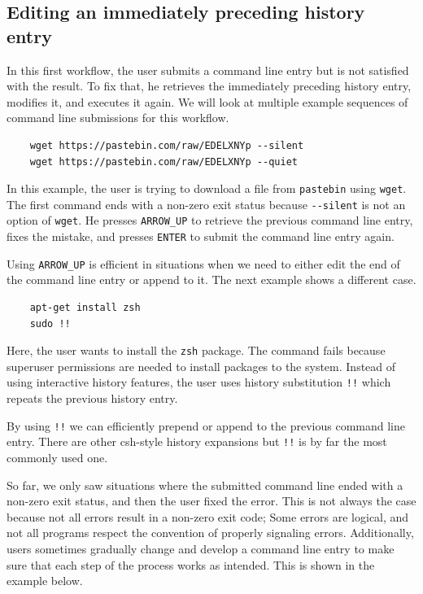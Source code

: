 
\subsection{Editing an immediately preceding history entry}

In this first workflow, the user submits a command line entry but is not satisfied with the result. To fix that, he retrieves the immediately preceding history entry, modifies it, and executes it again. We will look at multiple example sequences of command line submissions for this workflow.

\begin{verbatim}
    wget https://pastebin.com/raw/EDELXNYp --silent
    wget https://pastebin.com/raw/EDELXNYp --quiet
\end{verbatim}
In this example, the user is trying to download a file from \verb|pastebin| using \verb|wget|. The first command ends with a non-zero exit status because \verb|--silent| is not an option of \verb|wget|. He presses \verb|ARROW_UP| to retrieve the previous command line entry, fixes the mistake, and presses \verb|ENTER| to submit the command line entry again. 

Using \verb|ARROW_UP| is efficient in situations when we need to either edit the end of the command line entry or append to it. %
The next example shows a different case.

\begin{verbatim}
    apt-get install zsh
    sudo !!
\end{verbatim}

Here, the user wants to install the \verb|zsh| package. The command fails because superuser permissions are needed to install packages to the system. Instead of using interactive history features, the user uses history substitution \verb|!!| which repeats the previous history entry. 

By using \verb|!!| we can efficiently prepend or append to the previous command line entry. There are other csh-style history expansions but \verb|!!| is by far the most commonly used one. 

So far, we only saw situations where the submitted command line ended with a non-zero exit status, and then the user fixed the error. This is not always the case because not all errors result in a non-zero exit code; Some errors are logical, and not all programs respect the convention of properly signaling errors. Additionally, users sometimes gradually change and develop a command line entry to make sure that each step of the process works as intended. This is shown in the example below.

